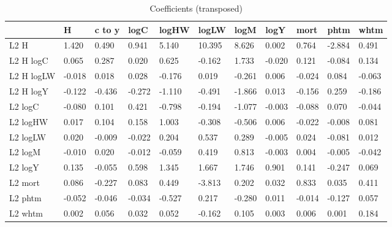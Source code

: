 \begin{table}[htbp]
\caption{\label{clabel} Coefficients (transposed)}\centering\medskip
\begin{tabular}{lllllllllll} \hline \hline
 & H  & c to y  & logC  & logHW  & logLW  & logM  & logY  & mort  & phtm  & whtm  \\  \hline 
L2 H &     1.420 &     0.490 &     0.941 &     5.140 &    10.395 &     8.626 &     0.002 &     0.764 &    -2.884 &     0.491 \\  
L2 H logC &     0.065 &     0.287 &     0.020 &     0.625 &    -0.162 &     1.733 &    -0.020 &     0.121 &    -0.084 &     0.134 \\  
L2 H logLW &    -0.018 &     0.018 &     0.028 &    -0.176 &     0.019 &    -0.261 &     0.006 &    -0.024 &     0.084 &    -0.063 \\  
L2 H logY &    -0.122 &    -0.436 &    -0.272 &    -1.110 &    -0.491 &    -1.866 &     0.013 &    -0.156 &     0.259 &    -0.186 \\  
L2 logC &    -0.080 &     0.101 &     0.421 &    -0.798 &    -0.194 &    -1.077 &    -0.003 &    -0.088 &     0.070 &    -0.044 \\  
L2 logHW &     0.017 &     0.104 &     0.158 &     1.003 &    -0.308 &    -0.506 &     0.006 &    -0.022 &    -0.008 &     0.081 \\  
L2 logLW &     0.020 &    -0.009 &    -0.022 &     0.204 &     0.537 &     0.289 &    -0.005 &     0.024 &    -0.081 &     0.012 \\  
L2 logM &    -0.010 &     0.020 &    -0.012 &    -0.059 &     0.419 &     0.813 &    -0.003 &     0.004 &    -0.005 &    -0.042 \\  
L2 logY &     0.135 &    -0.055 &     0.598 &     1.345 &     1.667 &     1.746 &     0.901 &     0.141 &    -0.247 &     0.069 \\  
L2 mort &     0.086 &    -0.227 &     0.083 &     0.449 &    -3.813 &     0.202 &     0.032 &     0.833 &     0.035 &     0.411 \\  
L2 phtm &    -0.052 &    -0.046 &    -0.034 &    -0.527 &     0.217 &    -0.280 &     0.011 &    -0.014 &    -0.127 &     0.057 \\  
L2 whtm &     0.002 &     0.056 &     0.032 &     0.052 &    -0.162 &     0.105 &     0.003 &     0.006 &     0.001 &     0.184 \\  

\end{tabular}
\end{table}
